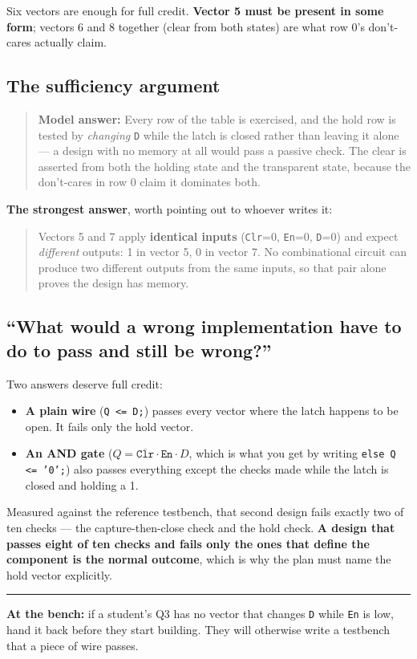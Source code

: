 \documentclass[11pt]{article}
\newcommand{\code}[1]{\texttt{#1}}
\newcommand{\hr}{\vspace{2pt}\hrule\vspace{6pt}}
\begin{document}
Six vectors are enough for full credit. \textbf{Vector 5 must be present in some
form}; vectors 6 and 8 together (clear from both states) are what row 0's
don't-cares actually claim.

\subsection*{The sufficiency argument}

\begin{quote}
\textbf{Model answer:} Every row of the table is exercised, and the hold row is
tested by \emph{changing} \code{D} while the latch is closed rather than leaving
it alone --- a design with no memory at all would pass a passive check. The clear
is asserted from both the holding state and the transparent state, because the
don't-cares in row 0 claim it dominates both.
\end{quote}

\textbf{The strongest answer}, worth pointing out to whoever writes it:
\begin{quote}
Vectors 5 and 7 apply \textbf{identical inputs} (\code{Clr}=0, \code{En}=0,
\code{D}=0) and expect \emph{different} outputs: 1 in vector 5, 0 in vector 7. No
combinational circuit can produce two different outputs from the same inputs, so
that pair alone proves the design has memory.
\end{quote}

\subsection*{``What would a wrong implementation have to do to pass and still be wrong?''}

Two answers deserve full credit:

\begin{itemize}[leftmargin=1.6em,itemsep=2pt]
\item \textbf{A plain wire} (\code{Q <= D;}) passes every vector where the latch
happens to be open. It fails only the hold vector.
\item \textbf{An AND gate} ($Q = \overline{\code{Clr}}\cdot\code{En}\cdot D$,
which is what you get by writing \code{else Q <= '0';}) also passes everything
except the checks made while the latch is closed and holding a 1.
\end{itemize}

Measured against the reference testbench, that second design fails exactly two of
ten checks --- the capture-then-close check and the hold check. \textbf{A design
that passes eight of ten checks and fails only the ones that define the component
is the normal outcome}, which is why the plan must name the hold vector
explicitly.

\vspace{6pt}
\hr
{\small \textbf{At the bench:} if a student's Q3 has no vector that changes
\code{D} while \code{En} is low, hand it back before they start building. They
will otherwise write a testbench that a piece of wire passes.}
\end{document}
